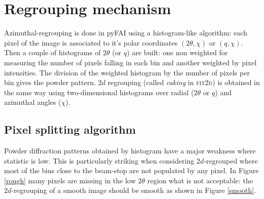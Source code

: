 \documentclass[a4paper]{jpconf}
\begin{document}
\section{Regrouping mechanism}
Azimuthal-regrouping is done in pyFAI using a histogram-like algorithm: each
pixel of the image is associated to it's polar coordinates
$(2\theta , \chi )$ or $(q, \chi )$. Then a couple of histograms of $2\theta$
(or $q$) are built:
one non weighted for measuring the number of pixels falling in each bin and
another weighted by pixel intensities.
The division of the weighted histogram by the number of pixels per bin gives
the powder pattern.
$2d$ regrouping (called \textit{caking} in \textsc{fit2d}) is obtained in the
same way using two-dimensional histograms over radial ($2\theta$ or $q$) and azimuthal angles
($\chi$).

\subsection{Pixel splitting algorithm}
Powder diffraction patterns obtained by histogram have a major weakness where
statistic is low.
This is particularly striking when considering  $2d$-regrouped where most of
the bins close to the beam-stop are not populated by any pixel.
In Figure \ref{rough} many pixels are missing in the low $2\theta$ region
what is not acceptable: the  $2d$-regrouping of a smooth image should be smooth
as shown in Figure \ref{smooth}.
\end{document}
